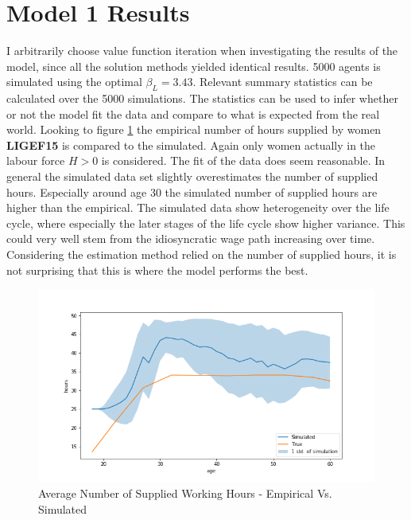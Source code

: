 \section{Model 1 Results}

I arbitrarily choose value function iteration when investigating the results of the model, since all the solution methods yielded identical results. 5000 agents is simulated using the optimal $\beta_L = 3.43$. Relevant summary statistics can be calculated over the 5000 simulations. The statistics can be used to infer whether or not the model fit the data and compare to what is expected from the real world. Looking to figure \ref{fig:dqi_model1_average_path_sim_vs_empirical} the empirical number of hours supplied by women \textbf{LIGEF15} is compared to the simulated. Again only women actually in the labour force $H>0$ is considered. The fit of the data does seem reasonable. In general the simulated data set slightly overestimates the number of supplied hours. Especially around age 30 the simulated number of supplied hours are higher than the empirical. The simulated data show heterogeneity over the life cycle, where especially the later stages of the life cycle show higher variance. This could very well stem from the idiosyncratic wage path increasing over time. Considering the estimation method relied on the number of supplied hours, it is not surprising that this is where the model performs the best. 


\begin{figure}
    \centering
    \includegraphics[scale=0.4]{figures/dqi_model1_estimation_labour_supply.png}
    \caption{Average Number of Supplied Working Hours - Empirical Vs. Simulated}
    \label{fig:dqi_model1_average_path_sim_vs_empirical}
\end{figure}


